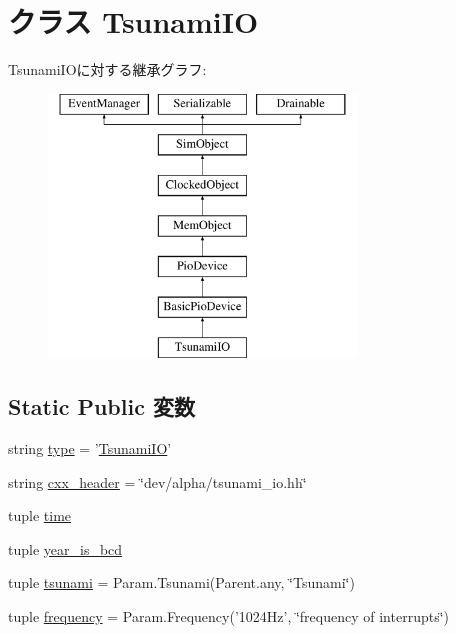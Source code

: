 \hypertarget{classTsunami_1_1TsunamiIO}{
\section{クラス TsunamiIO}
\label{classTsunami_1_1TsunamiIO}
}
TsunamiIOに対する継承グラフ:\begin{figure}[H]
\begin{center}
\leavevmode
\includegraphics[height=7cm]{classTsunami_1_1TsunamiIO}
\end{center}
\end{figure}
\subsection*{Static Public 変数}
\begin{DoxyCompactItemize}
\item 
string \hyperlink{classTsunami_1_1TsunamiIO_acce15679d830831b0bbe8ebc2a60b2ca}{type} = '\hyperlink{classTsunami_1_1TsunamiIO}{TsunamiIO}'
\item 
string \hyperlink{classTsunami_1_1TsunamiIO_a17da7064bc5c518791f0c891eff05fda}{cxx\_\-header} = \char`\"{}dev/alpha/tsunami\_\-io.hh\char`\"{}
\item 
tuple \hyperlink{classTsunami_1_1TsunamiIO_a429c35172fbcb8b1788bead147e4719b}{time}
\item 
tuple \hyperlink{classTsunami_1_1TsunamiIO_aaec21bf266d8a17759fe4f5bf79b06fb}{year\_\-is\_\-bcd}
\item 
tuple \hyperlink{classTsunami_1_1TsunamiIO_aabfaa1eda1546a625690c7a59b7fed04}{tsunami} = Param.Tsunami(Parent.any, \char`\"{}Tsunami\char`\"{})
\item 
tuple \hyperlink{classTsunami_1_1TsunamiIO_aa6caae816bc3cac7f328268ca3cdf2f7}{frequency} = Param.Frequency('1024Hz', \char`\"{}frequency of interrupts\char`\"{})
\end{DoxyCompactItemize}


